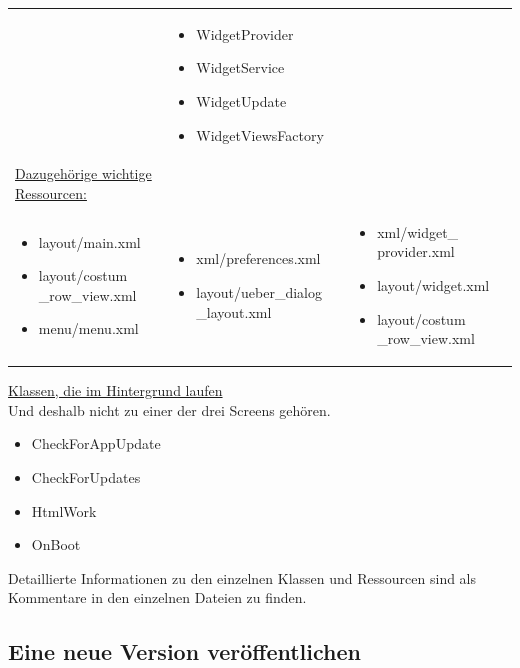\documentclass[12pt,headsepline]{scrartcl}
\begin{document}
\begin{center}
\begin{longtable}{p{5cm}p{5cm}p{5cm}}
\begin{itemize}
\end{itemize} &
\begin{itemize}
 \item WidgetProvider
 \item WidgetService
 \item WidgetUpdate
 \item WidgetViewsFactory
\end{itemize}\\
\newpage
\underline{Dazugehörige wichtige Ressourcen:}& & \\
\begin{itemize}
 \item layout/main.xml
 \item layout/costum \_row\_view.xml
 \item menu/menu.xml
\end{itemize} &
\begin{itemize}
 \item xml/preferences.xml
 \item layout/ueber\_dialog \_layout.xml
\end{itemize} &
\begin{itemize}
 \item xml/widget\_ provider.xml
 \item layout/widget.xml
 \item layout/costum \_row\_view.xml
\end{itemize} \\
\end{longtable}

\end{center}
\underline{Klassen, die im Hintergrund laufen}\\
\small{Und deshalb nicht zu einer der drei Screens gehören.}
\begin{itemize}
 \item CheckForAppUpdate
 \item CheckForUpdates
 \item HtmlWork
 \item OnBoot
\end{itemize}
Detaillierte Informationen zu den einzelnen Klassen und Ressourcen sind als Kommentare in den einzelnen Dateien zu finden. 
\subsection{Eine neue Version veröffentlichen}
\end{document}
